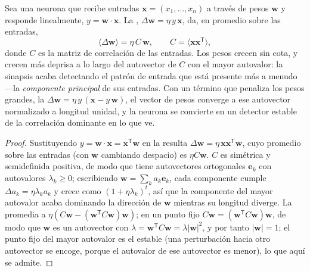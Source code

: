 \begin{theorem}\label{thm:b3:learning-memory:hebb}
Sea una neurona que recibe entradas $\mathbf{x} = (x_{1},\dots,x_{n})$ a
través de pesos $\mathbf{w}$ y responde linealmente, $y = \mathbf{w}\cdot\mathbf{x}$.
La , $\Delta\mathbf{w} = \eta\, y\,\mathbf{x}$, da, en
promedio sobre las entradas,
\[
\langle\Delta\mathbf{w}\rangle = \eta\,C\,\mathbf{w}, \qquad C =
\langle\mathbf{x}\mathbf{x}^{\mathsf{T}}\rangle ,
\]
donde $C$ es la matriz de correlación de las entradas. Los pesos crecen
sin cota, y crecen más deprisa a lo largo del autovector de $C$ con el
mayor autovalor: la sinapsis acaba detectando el patrón de entrada que
está presente más a menudo ---la \emph{componente principal} de sus
entradas. Con un término que penaliza los pesos grandes, la \emph{} $\Delta\mathbf{w} = \eta\, y\,(\mathbf{x} - y\,\mathbf{w})$, el
vector de pesos converge a ese autovector normalizado a longitud
unidad, y la neurona se convierte en un detector estable de la
correlación dominante en lo que ve.
\end{theorem}
\begin{proof}
Sustituyendo $y = \mathbf{w}\cdot\mathbf{x} = \mathbf{x}^{\mathsf{T}}
\mathbf{w}$ en la  resulta $\Delta\mathbf{w} = \eta\,\mathbf{x}
\mathbf{x}^{\mathsf{T}}\mathbf{w}$, cuyo promedio sobre las entradas
(con $\mathbf{w}$ cambiando despacio) es $\eta C\mathbf{w}$. $C$ es
simétrica y semidefinida positiva, de modo que tiene autovectores
ortogonales $\mathbf{e}_{k}$ con autovalores $\lambda_{k} \ge 0$;
escribiendo $\mathbf{w} = \sum_{k}
a_{k}\mathbf{e}_{k}$, cada componente cumple $\Delta a_{k} = \eta\lambda_{k}
a_{k}$ y crece como $(1 + \eta\lambda_{k})^{t}$, así que la componente
del mayor autovalor acaba dominando la dirección de $\mathbf{w}$
mientras su longitud diverge. La  promedia a $\eta(C\mathbf{w} -
(\mathbf{w}^{\mathsf{T}}C\mathbf{w})\mathbf{w})$; en un punto fijo
$C\mathbf{w} = (\mathbf{w}^{\mathsf{T}}C\mathbf{w})\mathbf{w}$, de modo
que $\mathbf{w}$ es un autovector con $\lambda = \mathbf{w}^{\mathsf{T}}
C\mathbf{w} = \lambda|\mathbf{w}|^{2}$, y por tanto $|\mathbf{w}| = 1$;
el punto fijo del mayor autovalor es el estable (una perturbación hacia
otro autovector se encoge, porque el autovalor de ese autovector es
menor), lo que aquí se admite.
\end{proof}


